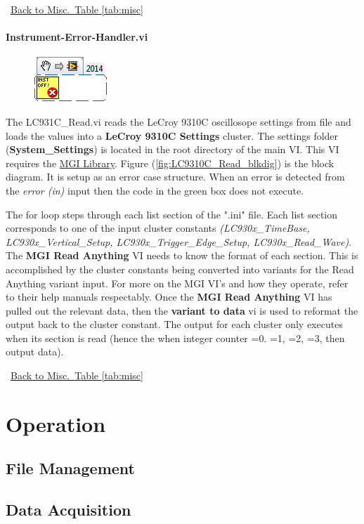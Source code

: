 \documentclass[11pt,a4paper,oldfontcommands]{memoir}
\begin{document}
\noindent\hrulefill\, \hyperref[tab:misc]{Back to Misc.\ Table \ref{tab:misc}}

\subsubsection{Instrument-Error-Handler.vi} \label{IEH}
\noindent\hrulefill

\begin{figure}[h]
	\includegraphics[scale=0.625]{Instrument-error-handler_main_01}
	\label{fig:Instrument-error-handler_main_01}
\end{figure}

The LC931C\_Read.vi reads the LeCroy 9310C oscillosope settings from file and loads the values into a \textbf{LeCroy 9310C Settings} cluster. The settings folder (\textbf{System\_Settings}) is located in the root directory of the main VI. This VI requires the \href{http://sine.ni.com/nips/cds/view/p/lang/en/nid/209753}{MGI Library}. Figure (\ref{fig:LC9310C_Read_blkdig}) is the block diagram.  It is setup as an error case structure. When an error is detected from the \textit{error (in)} input then the code in the green box does not execute.

The for loop steps through each list section of the ".ini" file. Each list section corresponds to one of the input cluster constants \textit{(LC930x\_TimeBase, LC930x\_Vertical\_Setup, LC930x\_Trigger\_Edge\_Setup, LC930x\_Read\_Wave)}. The \textbf{MGI Read Anything} VI needs to know the format of each section. This is accomplished by the cluster constants being converted into variants for the Read Anything variant input.  For more on the MGI VI's and how they operate, refer to their help manuals respectably. Once the \textbf{MGI Read Anything} VI has pulled out the relevant data, then the \textbf{variant to data} vi is used to reformat the output back to the cluster constant. The output for each cluster only executes when its section is read (hence the when integer counter =0. =1, =2, =3, then output data).

\noindent\hrulefill\, \hyperref[tab:misc]{Back to Misc.\ Table \ref{tab:misc}}

\chapter{Operation}

\section{File Management}

\section{Data Acquisition}




\end{document}
